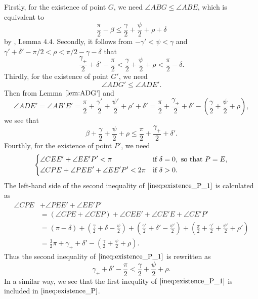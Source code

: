 \documentclass[11pt]{amsart}
\numberwithin{equation}{section}
\numberwithin{theorem}{section}
\begin{document}
Firstly, for the existence of point $G$, we need $\angle ABG\leqslant\angle ABE$, which is equivalent to
\begin{equation}\label{ineq:existence_G}
\frac{\pi}{2}-\beta\leqslant\frac{\gamma}{2}+\frac{\psi}{2}+\rho +\delta
\end{equation}
by \cite{Doi20}, Lemma $4.4$.
Secondly, it follows from $-\gamma'<\psi <\gamma$ and $\gamma'+\delta'-\pi /2<\rho <\pi /2 -\gamma -\delta$ that
\begin{equation}\label{ineq:existence_E}
\frac{\gamma_+}{2}+\delta'-\frac{\pi}{2}<\frac{\gamma}{2}+\frac{\psi}{2}+\rho <\frac{\pi}{2}-\delta .
\end{equation}
Thirdly, for the existence of point $G'$, we need
\begin{equation*}
\angle ADG'\leqslant\angle ADE'.
\end{equation*}
Then from Lemma $\ref{lem:ADG'}$ and
\begin{equation*}
\angle ADE'=\angle AB'E'=\frac{\pi}{2}+\frac{\gamma'}{2}+\frac{\psi'}{2}+\rho'+\delta'
=\frac{\pi}{2}+\frac{\gamma_+}{2}+\delta'-\left(\frac{\gamma}{2}+\frac{\psi}{2}+\rho\right) ,
\end{equation*}
we see that
\begin{equation}\label{ineq:existence_G'}
\beta +\frac{\gamma}{2}+\frac{\psi}{2}+\rho\leqslant\frac{\pi}{2}+\frac{\gamma_+}{2}+\delta'.
\end{equation}
Fourthly, for the existence of point $P'$, we need
\begin{equation}\label{ineq:existence_P_1}
\begin{dcases}
\angle CEE'+\angle EE'P'<\pi&\text{if }\delta =0,\text{ so that }P=E,\\
\angle CPE +\angle PEE'+\angle EE'P'<2\pi&\text{if }\delta >0.
\end{dcases}
\end{equation}
The left-hand side of the second inequality of $\eqref{ineq:existence_P_1}$ is calculated as
\begin{equation}\label{eq:E'P'P}
\begin{aligned}
\angle CPE&+\angle PEE'+\angle EE'P'\\
&=(\angle CPE+\angle CEP)+\angle CEE'+\angle CE'E +\angle CE'P'\\
&=(\pi -\delta )+\left(\frac{\gamma}{2}+\delta -\frac{\psi}{2}\right) +\left(\frac{\gamma'}{2}+\delta'-\frac{\psi'}{2}\right)
+\left(\frac{\pi}{2}+\frac{\gamma'}{2}+\frac{\psi'}{2}+\rho'\right)\\
&=\frac{3}{2}\pi +\gamma_++\delta'-\left(\frac{\gamma}{2}+\frac{\psi}{2}+\rho\right) .
\end{aligned}
\end{equation}
Thus the second inequality of $\eqref{ineq:existence_P_1}$ is rewritten as
\begin{equation}\label{ineq:existence_P}
\gamma_++\delta'-\frac{\pi}{2}<\frac{\gamma}{2}+\frac{\psi}{2}+\rho .
\end{equation}
In a similar way, we see that the first inequlity of $\eqref{ineq:existence_P_1}$ is included in $\eqref{ineq:existence_P}$.
\end{document}
